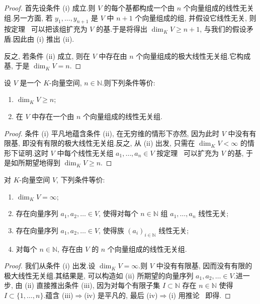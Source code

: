 \begin{proof}
首先设条件 (i) 成立.则 $V$ 的每个基都构成一个由 $n$ 个向量组成的线性无关组.另一方面, 若 $y_1, \ldots, y_{n+1}$ 是 $V$ 中 $n + 1$ 个向量组成的组, 并假设它线性无关, 则按定理~ 可以把该组扩充为 $V$ 的基.于是将得出 $\dim_K V \geq n + 1$, 与我们的假设矛盾.因此由 (i) 推出 (ii).

反之, 若条件 (ii) 成立, 则在 $V$ 中存在由 $n$ 个向量组成的极大线性无关组.它构成基, 于是 $\dim_K V = n$.
\end{proof}

\begin{corollary}\label{cor:1.5.12}
设 $V$ 是一个 $K$-向量空间, $n \in \mathbb{N}$.则下列条件等价:
\begin{enumerate}
\item[(i)] $\dim_K V \geq n$;
\item[(ii)] 在 $V$ 中存在一个由 $n$ 个向量组成的线性无关组.
\end{enumerate}
\end{corollary}

\begin{proof}
条件 (i) 平凡地蕴含条件 (ii), 在无穷维的情形下亦然, 因为此时 $V$ 中没有有限基, 即没有有限的极大线性无关组.反之, 从 (ii) 出发, 只需在 $\dim_K V < \infty$ 的情形下证明.这时 $V$ 中每个线性无关组 $a_1, \ldots, a_n \in V$ 按定理~ 可以扩充为 $V$ 的基, 于是如所期望地得到 $\dim_K V \geq n$.
\end{proof}

\begin{corollary}[无穷维的刻画]\label{cor:1.5.13}
对 $K$-向量空间 $V$, 下列条件等价:
\begin{enumerate}
\item[(i)] $\dim_K V = \infty$;
\item[(ii)] 存在向量序列 $a_1, a_2, \ldots \in V$, 使得对每个 $n \in \mathbb{N}$ 组 $a_1, \ldots, a_n$ 线性无关;
\item[(iii)] 存在向量序列 $a_1, a_2, \ldots \in V$, 使得族 $(a_i)_{i \in \mathbb{N}}$ 线性无关;
\item[(iv)] 对每个 $n \in \mathbb{N}$, 存在由 $V$ 的 $n$ 个向量组成的线性无关组.
\end{enumerate}
\end{corollary}

\begin{proof}
我们从条件 (i) 出发.设 $\dim_K V = \infty$.则 $V$ 中没有有限基, 因而没有有限的极大线性无关组.其结果是, 可以构造如 (ii) 所期望的向量序列 $a_1, a_2, \ldots \in V$.进一步, 由 (ii) 直接推出条件 (iii), 因为对每个有限子集 $I \subset \mathbb{N}$ 存在 $n \in \mathbb{N}$ 使得 $I \subset \{1, \ldots, n\}$.蕴含 (iii)$\Longrightarrow$(iv) 是平凡的, 最后 (iv)$\Longrightarrow$(i) 用推论~ 即得.
\end{proof}

